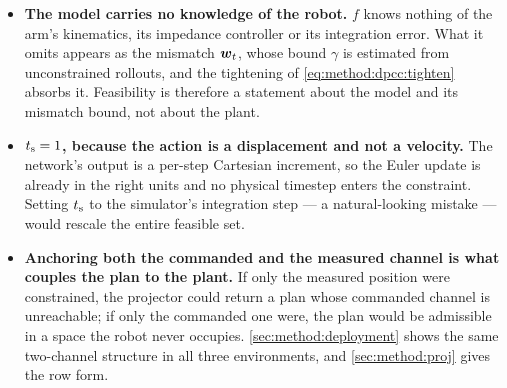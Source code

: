 \begin{itemize}
  \item \textbf{The model carries no knowledge of the robot.} $f$ knows nothing of the arm's
    kinematics, its impedance controller or its integration error. What it omits appears as the
    mismatch $\boldsymbol{w}_{t}$, whose bound $\gamma$ is estimated from unconstrained rollouts, and the
    tightening of \eqref{eq:method:dpcc:tighten} absorbs it. Feasibility is therefore a statement
    about the model and its mismatch bound, not about the plant.
  \item \textbf{$t_{\textrm{s}} = 1$, because the action is a displacement and not a velocity.} The
    network's output is a per-step Cartesian increment, so the Euler update is already in the right
    units and no physical timestep enters the constraint. Setting $t_{\textrm{s}}$ to the simulator's
    integration step --- a natural-looking mistake --- would rescale the entire feasible set.
  \item \textbf{Anchoring both the commanded and the measured channel is what couples the plan to
    the plant.} If only the measured position were constrained, the projector could return a plan
    whose commanded channel is unreachable; if only the commanded one were, the plan would be
    admissible in a space the robot never occupies. \autoref{sec:method:deployment} shows the same
    two-channel structure in all three environments, and \autoref{sec:method:proj} gives the row form.
\end{itemize}

